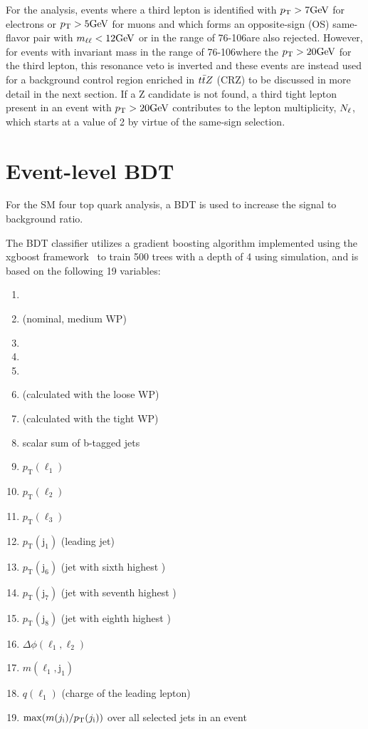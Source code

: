 For the \smft analysis, events where a third lepton is identified with $p_{\mathrm{T}}>7\text{GeV}$ for electrons
or $p_{\mathrm{T}}>5\text{GeV}$ for muons and which forms an opposite-sign (OS) same-flavor pair
with $m_{\ell\ell}<12\text{GeV}$ or in the range of 76-106\GeV are also rejected.
However, for events with invariant mass in the range of 76-106\GeV where
the $p_{\mathrm{T}}>20\text{GeV}$ for the third lepton, 
this resonance veto is inverted
and these events are instead used for a background control region 
enriched in $t\bar{t} Z$ (CRZ) to be discussed in more detail in the next
section. If a Z candidate is not found, a third tight lepton present in an event
with $p_{\mathrm{T}}>20\text{GeV}$ contributes to the lepton multiplicity, $N_\ell$, which 
starts at a value of 2 by virtue of the same-sign selection.

\section{Event-level BDT}

For the SM four top quark analysis, a BDT is used to increase the signal to
background ratio.

The BDT classifier utilizes a gradient boosting algorithm 
implemented using the xgboost framework~\cite{MISC:xgboost}
to train 500 trees
with a depth of 4 using simulation, and is based on the following 19
variables:
\begin{enumerate}
    \item \Njets
    \item \Nbjets (nominal, medium WP)
    \item \Nleps
    \item \ptmiss
    \item \HT
    \item \Nbjets (calculated with the loose WP)
    \item \Nbjets (calculated with the tight WP)
    \item scalar \pt sum of b-tagged jets
    \item $p_\mathrm{T}(\ell_1)$
    \item $p_\mathrm{T}(\ell_2)$
    \item $p_\mathrm{T}(\ell_3)$
    \item $p_\mathrm{T}(\mathrm{j}_1)$  (leading jet)
    \item $p_\mathrm{T}(\mathrm{j}_6)$ (jet with sixth highest \pt)
    \item $p_\mathrm{T}(\mathrm{j}_7)$ (jet with seventh highest \pt)
    \item $p_\mathrm{T}(\mathrm{j}_8)$ (jet with eighth highest \pt)
    \item $\Delta\phi(\ell_1,\ell_2)$
    \item $m(\ell_1,\mathrm{j}_1)$
    \item $q(\ell_1)$ (charge of the leading lepton)
    \item $\mathrm{max}(m(j_\mathrm{i})/p_{\mathrm{T}}(j_\mathrm{i}))$ over all selected jets in an event
\end{enumerate}

